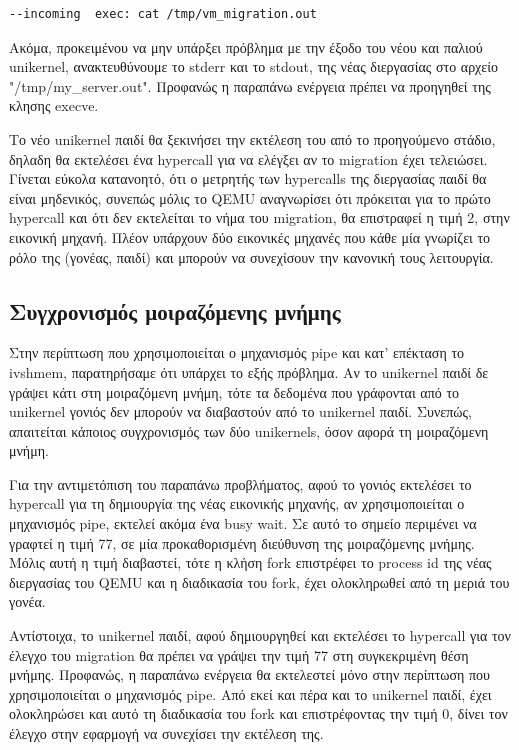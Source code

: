 \begin{lstlisting}[numbers=none]
--incoming  exec: cat /tmp/vm_migration.out 
\end{lstlisting}

Ακόμα, προκειμένου να μην υπάρξει πρόβλημα με την έξοδο του νέου και παλιού
unikernel, ανακτευθύνουμε το stderr και το stdout, της νέας διεργασίας στο
αρχείο "/tmp/my\_server.out". Προφανώς η παραπάνω ενέργεια πρέπει να προηγηθεί
της κλησης execve. 

Το νέο unikernel παιδί θα ξεκινήσει την εκτέλεση του από το προηγούμενο στάδιο,
δηλαδη θα εκτελέσει ένα hypercall για να ελέγξει αν το migration έχει τελειώσει.
Γίνεται εύκολα κατανοητό, ότι ο μετρητής των hypercalls της διεργασίας παιδί θα
είναι μηδενικός, συνεπώς μόλις το QEMU αναγνωρίσει ότι πρόκειται για το πρώτο
hypercall και ότι δεν εκτελείται το νήμα του migration, θα επιστραφεί η τιμή 2,
στην εικονική μηχανή. Πλέον υπάρχουν δύο εικονικές μηχανές που κάθε μία γνωρίζει
το ρόλο της (γονέας, παιδί) και μπορούν να συνεχίσουν την κανονική τους λειτουργία.

\subsection{Συγχρονισμός μοιραζόμενης μνήμης}

Στην περίπτωση που χρησιμοποιείται ο μηχανισμός pipe και κατ' επέκταση το ivshmem,
παρατηρήσαμε ότι υπάρχει το εξής πρόβλημα. Αν το unikernel παιδί δε γράψει κάτι
στη μοιραζόμενη μνήμη, τότε τα δεδομένα που γράφονται από το unikernel γονιός
δεν μπορούν να διαβαστούν από το unikernel παιδί. Συνεπώς, απαιτείται κάποιος
συγχρονισμός των δύο unikernels, όσον αφορά τη μοιραζόμενη μνήμη. 

Για την αντιμετόπιση του παραπάνω προβλήματος, αφού το  γονιός
εκτελέσει το hypercall για τη δημιουργία της νέας εικονικής μηχανής, αν
χρησιμοποιείται ο μηχανισμός pipe, εκτελεί ακόμα ένα busy wait. Σε αυτό το
σημείο περιμένει να γραφτεί η τιμή 77, σε μία προκαθορισμένη διεύθυνση της
μοιραζόμενης μνήμης. Μόλις αυτή η τιμή διαβαστεί, τότε η κλήση fork επιστρέφει
το process id της νέας διεργασίας του QEMU και η διαδικασία του fork, έχει
ολοκληρωθεί από τη μεριά του γονέα. 

Αντίστοιχα, το unikernel παιδί, αφού δημιουργηθεί και εκτελέσει το hypercall για
τον έλεγχο του migration θα πρέπει να γράψει την τιμή 77 στη συγκεκριμένη θέση
μνήμης. Προφανώς, η παραπάνω ενέργεια θα εκτελεστεί μόνο στην περίπτωση που
χρησιμοποιείται ο μηχανισμός pipe. Από εκεί και πέρα και το unikernel παιδί,
έχει ολοκληρώσει και αυτό τη διαδικασία του fork και επιστρέφοντας την τιμή 0,
δίνει τον έλεγχο στην εφαρμογή να συνεχίσει την εκτέλεση της.

